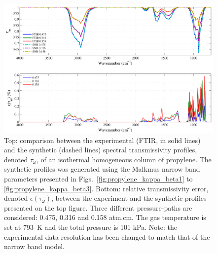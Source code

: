 \begin{figure}[p]
\includegraphics[width=\textwidth]{Figures/Comparison_Fit_Propylene_MALKMUS_Temp793K.pdf}
\caption{Top: comparison between the experimental (FTIR, in solid lines) and the synthetic (dashed lines) spectral transmissivity profiles, denoted $\tau_{\omega}$, of an isothermal homogeneous column of propylene. The synthetic profiles was generated using the Malkmus narrow band parameters presented in Figs.~\ref{fig:propylene_kappa_beta1} to \ref{fig:propylene_kappa_beta3}. Bottom: relative transmissivity error, denoted $\epsilon{(\tau_{\omega})}$, between the experiment and the synthetic profiles presented on the top figure. Three different pressure-paths are considered: 0.475, 0.316 and 0.158 atm.cm. The gas temperature is set at 793~K and the total pressure is 101 kPa. Note: the experimental data resolution has been changed to match that of the narrow band model. \label{fig:propylene_SNBVerify_793K}}
\end{figure}

